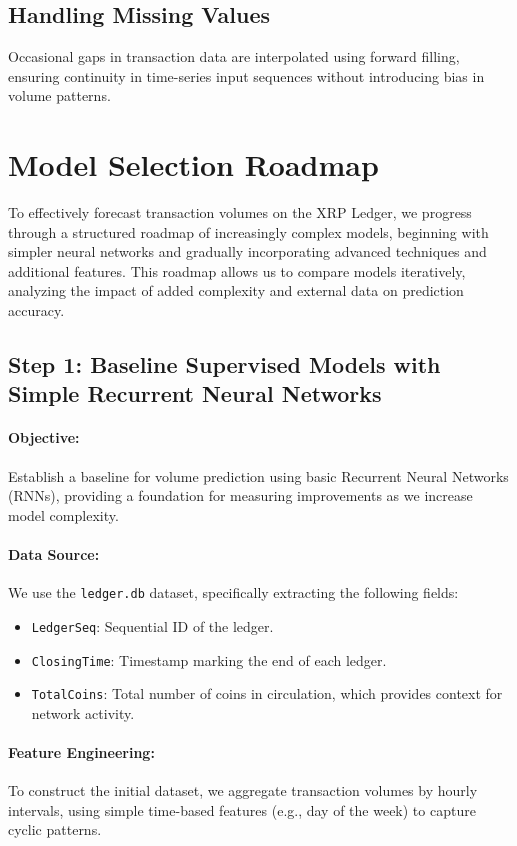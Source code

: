 \documentclass{article}
\begin{document}
\subsection{Handling Missing Values}
Occasional gaps in transaction data are interpolated using forward filling, ensuring continuity in time-series input sequences without introducing bias in volume patterns.

\section{Model Selection Roadmap}

To effectively forecast transaction volumes on the XRP Ledger, we progress through a structured roadmap of increasingly complex models, beginning with simpler neural networks and gradually incorporating advanced techniques and additional features. This roadmap allows us to compare models iteratively, analyzing the impact of added complexity and external data on prediction accuracy.

\subsection{Step 1: Baseline Supervised Models with Simple Recurrent Neural Networks}

\paragraph{Objective:} Establish a baseline for volume prediction using basic Recurrent Neural Networks (RNNs), providing a foundation for measuring improvements as we increase model complexity.

\paragraph{Data Source:} 
We use the \texttt{ledger.db} dataset, specifically extracting the following fields:
\begin{itemize}
    \item \texttt{LedgerSeq}: Sequential ID of the ledger.
    \item \texttt{ClosingTime}: Timestamp marking the end of each ledger.
    \item \texttt{TotalCoins}: Total number of coins in circulation, which provides context for network activity.
\end{itemize}

\paragraph{Feature Engineering:}
To construct the initial dataset, we aggregate transaction volumes by hourly intervals, using simple time-based features (e.g., day of the week) to capture cyclic patterns.
\end{document}
